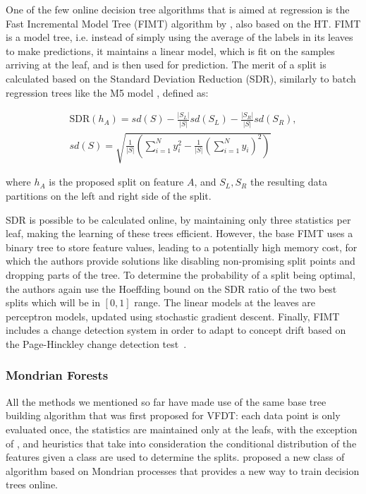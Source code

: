 One of the few online decision tree algorithms that is aimed at regression
is the Fast Incremental Model Tree (FIMT) algorithm by \citet{fimt}, also
based on the HT. FIMT
is a model tree, i.e. instead of simply using the average of the labels
in its leaves to make predictions, it maintains a linear model, which is
fit on the samples arriving at the leaf, and is then used for prediction.
The merit of a split is calculated based on the Standard Deviation Reduction (SDR),
similarly to batch regression trees like the M5 model \cite{m5-tree}, defined as:

\begin{equation}
	\begin{split}
		\text{SDR}(h_A)=sd(S)-\frac{|S_L|}{|S|}sd\left(S_{L}\right)-\frac{|S_R|}{|S|}sd\left(S_{R}\right), \\
		sd(S) = \sqrt{\frac{1}{|S|}\left(\sum_{i=1}^{N}y_{i}^{2}-\frac{1}{|S|}\left(\sum_{i=1}^{N}y_{i}\right)^{2}\right)}
	\end{split}
\end{equation}

\noindent
where $h_A$ is the proposed split on feature $A$, and $S_L, S_R$ the resulting
data partitions on the left and right side of the split.

SDR is possible to be calculated online, by maintaining only three statistics per leaf,
making the learning of these trees efficient. However, the base FIMT uses a binary tree
to store feature values, leading to a potentially high memory cost, for which
the authors provide solutions like disabling non-promising split points and dropping
parts of the tree. To determine the
probability of a split being optimal, the authors again use the Hoeffding bound
on the SDR ratio of the two best splits which will be in $[0, 1]$ range.
The linear models at the leaves are perceptron models, updated using stochastic
gradient descent.  Finally, FIMT includes a change detection system in order to
adapt to concept drift
based on the Page-Hinckley change detection test~\cite{ph-test, ph-test2}.


\subsubsection*{Mondrian Forests}

All the methods we mentioned so far have made use of the same base tree building
algorithm that was first proposed for VFDT: each data point is only evaluated once,
the statistics are maintained only at the leafs, with the exception of \cite{efdt},
and heuristics that take into consideration the conditional distribution of the
features given a class are used to determine the splits. \citet{mondrian-forests-original}
proposed a new class of algorithm based on Mondrian processes \cite{mondrian-process}
that provides a new way to train decision trees online.

